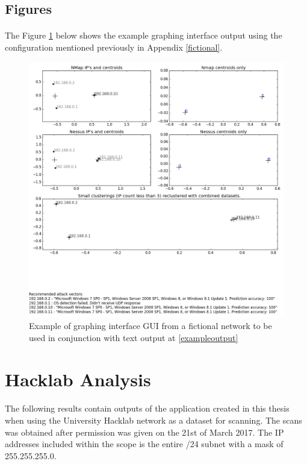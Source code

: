 \subsection{Figures}
\label{example_dual}

\paragraph{}The Figure \ref{example_twin} below shows the example graphing interface output using the configuration mentioned previously in Appendix \ref{fictional}.

\begin{figure}[!h]
\centering
\includegraphics[width=6in]{./Figures/example_dual.png}
\caption{Example of graphing interface GUI from a fictional network to be used in conjunction with text output at \ref{exampleoutput}}
\label{example_twin}
\end{figure}


\section{Hacklab Analysis}
\label{hacklab}

\paragraph{}The following results contain outputs of the application created in this thesis when using the University Hacklab network as a dataset for scanning. The scans was obtained after permission was given on the 21st of March 2017. The IP addresses included within the scope is the entire /24 subnet with a mask of 255.255.255.0.


